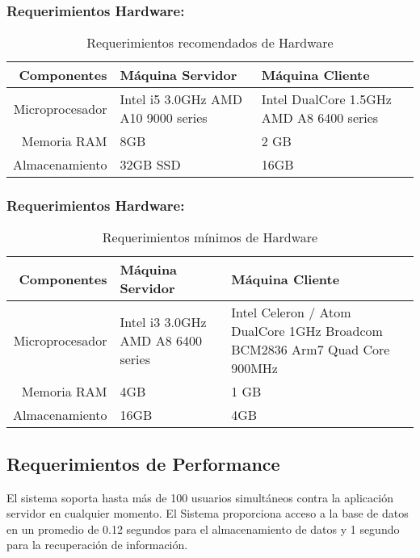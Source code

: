 \documentclass[a4paper,11pt, spanish]{report}
\begin{document}
{{{{{{        \subsubsection{Requerimientos Hardware:}
        {\renewcommand{\arraystretch}{1.7}%
        \noindent\begin{table}[H]
        \noindent\begin{tabularx}{\textwidth}{r|X|X}
          \textbf{{\large Componentes}} & \textbf{{\large Máquina Servidor}} & \textbf{{\large Máquina Cliente}} \\
          \hline
         Microprocesador & Intel i5 3.0GHz \newline AMD A10 9000 series & Intel DualCore 1.5GHz \newline AMD A8 6400 series\\ \hline
         Memoria RAM & 8GB & 2 GB \\ \hline
         Almacenamiento & 32GB SSD & 16GB \\ \hline
        \end{tabularx}
        \caption{Requerimientos recomendados de Hardware}
        \end{table}
        \subsubsection{Requerimientos Hardware:}
        {\renewcommand{\arraystretch}{1.7}%
        \noindent\begin{table}[H]
        \noindent\begin{tabularx}{\textwidth}{r|X|X}
          \textbf{{\large Componentes}} & \textbf{{\large Máquina Servidor}} & \textbf{{\large Máquina Cliente}} \\
          \hline
         Microprocesador & Intel i3 3.0GHz \newline AMD A8 6400 series & Intel Celeron / Atom DualCore 1GHz \newline Broadcom BCM2836 Arm7 Quad Core 900MHz\\ \hline
         Memoria RAM & 4GB & 1 GB \\ \hline
         Almacenamiento & 16GB & 4GB \\ \hline
        \end{tabularx}
        \caption{Requerimientos mínimos de Hardware}
        \end{table}

        \subsection{Requerimientos de Performance}
             El sistema soporta hasta más de 100 usuarios simultáneos contra la aplicación servidor en cualquier momento. El Sistema proporciona acceso a la base de datos en un promedio de 0.12 segundos para el almacenamiento de datos y 1 segundo para la recuperación de información.
}}}}}}}}
\end{document}
